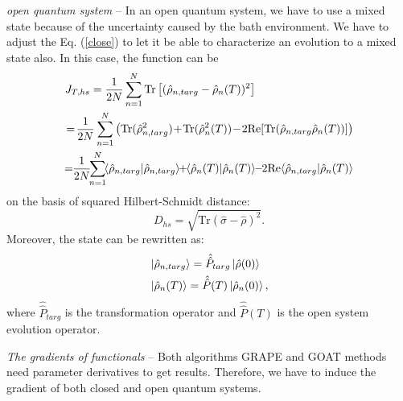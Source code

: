 \textit{open quantum system} -- In an open quantum system, we have to use a mixed state because of the uncertainty caused by the bath environment. We have to adjust the Eq. (\ref{close}) to let it be able to characterize an evolution to a mixed state also. In this case, the function can be
\begin{equation}
    \begin{split}
        &J_{T,hs}=\frac{1}{2N}\sum_{n=1}^{N}\text{Tr}\left[(\hat{\rho}_{n,targ}-\hat{\rho}_{n}(T))^{2}\right]\\
        &\!=\!\frac{1}{2N}\sum_{n=1}^{N}\left(\text{Tr}(\hat{\rho}^{2}_{n,targ})\!+\!\text{Tr}(\hat{\rho}^{2}_{n}(T))\!-\!2\mathrm{Re}[\text{Tr}(\hat{\rho}_{n,targ}\hat{\rho}_{n}(T))]\right)\\
        &\!\!=\!\!\frac{1}{2N}\!\!\sum_{n=1}^{N}\!\!\braket{\hat{\rho}_{n,targ}|\hat{\rho}_{n,targ}}\!\!+\!\!\braket{\hat{\rho}_{n}(T)|\hat{\rho}_{n}(T)}\!\!-\!\!2\mathrm{Re}\!\braket{{\hat{\rho}_{n,targ}|\hat{\rho}_{n}(T)}}
    \end{split}
\end{equation}
on the basis of squared Hilbert-Schmidt distance:
\begin{equation}
    D_{hs}=\sqrt{\mathrm{Tr}(\hat{\sigma}-\hat{\rho})^{2}}.
\end{equation}
Moreover, the state can be rewritten as:
\begin{equation}
    \begin{split}
        &\ket{\hat{\rho}_{n,targ}}=\hat{\hat{P}}_{targ}\ket{\hat{\rho}(0)}\\
        &\ket{\hat{\rho}_{n}(T)}=\hat{\hat{P}}(T)\ket{\hat{\rho}_{n}(0)},
    \end{split}
\end{equation}
where $\hat{\hat{P}}_{targ}$ is the transformation operator and $\hat{\hat{P}}(T)$ is the open system evolution operator.

\textit{The gradients of functionals} -- Both algorithms GRAPE and GOAT methods need parameter derivatives to get results. Therefore, we have to induce the gradient of both closed and open quantum systems.

